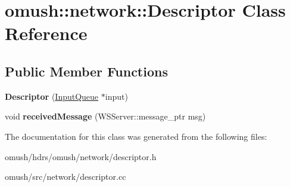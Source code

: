 \hypertarget{classomush_1_1network_1_1_descriptor}{\section{omush\-:\-:network\-:\-:Descriptor Class Reference}
\label{classomush_1_1network_1_1_descriptor}
}
\subsection*{Public Member Functions}
\begin{DoxyCompactItemize}
\item 
\hypertarget{classomush_1_1network_1_1_descriptor_aa7fa2b755acee2ad25bda5212f130b6e}{{\bfseries Descriptor} (\hyperlink{classomush_1_1network_1_1_input_queue}{Input\-Queue} $\ast$input)}\label{classomush_1_1network_1_1_descriptor_aa7fa2b755acee2ad25bda5212f130b6e}

\item 
\hypertarget{classomush_1_1network_1_1_descriptor_a080137741db1f8441cd2541afb8c21b6}{void {\bfseries received\-Message} (W\-S\-Server\-::message\-\_\-ptr msg)}\label{classomush_1_1network_1_1_descriptor_a080137741db1f8441cd2541afb8c21b6}

\end{DoxyCompactItemize}


The documentation for this class was generated from the following files\-:\begin{DoxyCompactItemize}
\item 
omush/hdrs/omush/network/descriptor.\-h\item 
omush/src/network/descriptor.\-cc\end{DoxyCompactItemize}
